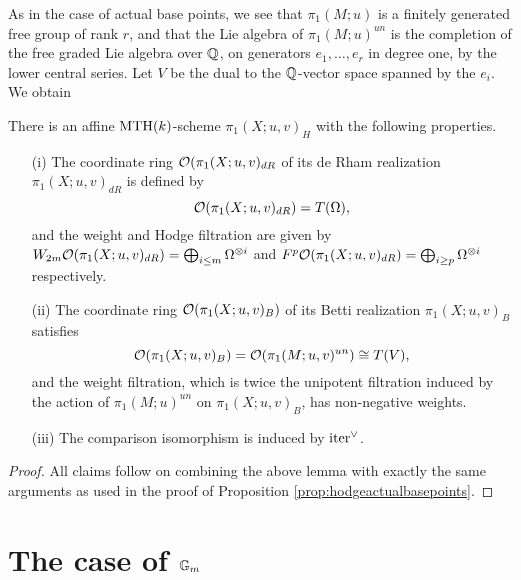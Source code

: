 As in the case of actual base points, we see that 
$\pi_1(M;u)$ is a finitely generated free group of rank $r$, and that the Lie algebra of $\pi_1(M;u)^{un}$ is the completion of the free graded Lie algebra over $\mathbb{Q}$,
on generators $e_1,\dotsc,e_r$ in degree one, by the lower central series. Let $V$ be the dual to the $\mathbb{Q}$-vector space spanned by the $e_i$. We obtain

\begin{prop}\label{prop:hodgetangbasepoints}
There is an affine $\mathrm{MTH}(k)$-scheme $\pi_1(X;u,v)_H$ with the following properties. 
\begin{itemize}
\item[(i)] The coordinate ring $\mathcal{O}(\pi_1(X;u,v)_{dR}$ of its de Rham realization $\pi_1(X;u,v)_{dR}$ is defined by
$$\mathcal{O}(\pi_1(X;u,v)_{dR})=T(\Omega),$$
and the weight and Hodge filtration are given by $W_{2m}\mathcal{O}(\pi_1(X;u,v)_{dR})=\bigoplus_{i\leq m}\Omega^{\otimes i}$ and $F^p\mathcal{O}(\pi_1(X;u,v)_{dR})=\bigoplus_{i\geq p}\Omega^{\otimes i}$ respectively. 
\item[(ii)] The coordinate ring $\mathcal{O}(\pi_1(X;u,v)_{B})$ of its Betti realization $\pi_1(X;u,v)_{B}$ satisfies
$$\mathcal{O}(\pi_1(X;u,v)_{B})=\mathcal{O}(\pi_1(M;u,v)^{un})\cong T(V),$$
and the weight filtration, which is twice the unipotent filtration induced by the action of $\pi_1(M;u)^{un}$ on $\pi_1(X;u,v)_{B}$, has non-negative weights. 
\item[(iii)] The comparison isomorphism is induced by $\mathrm{iter}^{\vee}$.
\end{itemize}
\end{prop}
\begin{proof}
All claims follow on combining the above lemma with exactly the same arguments as used in the proof of Proposition \ref{prop:hodgeactualbasepoints}.
\end{proof}

\section{The case of $\mathbb{G}_m$}

